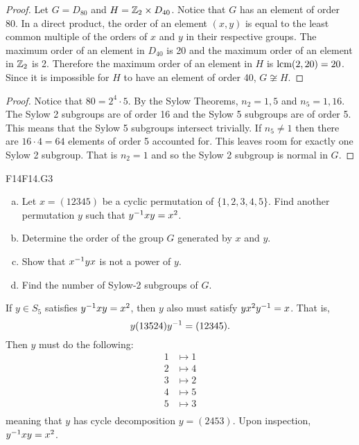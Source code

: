 \documentclass[../../AlgebraQualSolutions.tex]{subfiles}
\begin{document}
	\begin{proof}
		Let $G = D_{80}$ and $H = \mathbb{Z}_2 \times D_{40}$. Notice that $G$ has an element of order 80. In a direct product, the order of an element $(x,y)$ is equal to the least common multiple of the orders of $x$ and $y$ in their respective groups. The maximum order of an element in $D_{40}$ is 20 and the maximum order of an element in $\mathbb{Z}_2$ is 2. Therefore the maximum order of an element in $H$ is $\textrm{lcm}(2,20) = 20$. Since it is impossible for $H$ to have an element of order 40, $G \not\cong H$.
	\end{proof}

	\begin{proof}
		Notice that $80 = 2^4 \cdot 5$. By the Sylow Theorems, $n_2 = 1, 5$ and $n_5 = 1,16$. The Sylow 2 subgroups are of order 16 and the Sylow 5 subgroups are of order 5. This means that the Sylow 5 subgroups intersect trivially. If $n_5 \neq 1$ then there are $16 \cdot 4 = 64$ elements of order 5 accounted for. This leaves room for exactly one Sylow 2 subgroup. That is $n_2 = 1$ and so the Sylow 2 subgroup is normal in $G$.
	\end{proof}

	\begin{prob}{F14}{F14.G3}
		\begin{enumerate}[(a)]
			\item Let $x = (12345)$ be a cyclic permutation of $\{1,2,3,4,5\}$. Find another permutation $y$ such that $y^{-1} xy = x^2$.
			\item Determine the order of the group $G$ generated by $x$ and $y$.
			\item Show that $x^{-1} y x$ is not a power of $y$.
			\item Find the number of Sylow-2 subgroups of $G$.
		\end{enumerate}
	\end{prob}

	\begin{solution}
		If $y \in S_5$ satisfies  $y^{-1} xy = x^2$, then $y$ also must satisfy $yx^2y^{-1} = x$. That is,
			\[y(13524)y^{-1} = (12345).\]
		Then $y$ must do the following:
			\begin{align*}
				1 &\mapsto 1\\
				2 &\mapsto 4\\
				3 &\mapsto 2\\
				4 &\mapsto 5\\
				5 &\mapsto 3\\
			\end{align*}
		meaning that $y$ has cycle decomposition $y = (2453)$. Upon inspection, $y^{-1} x y = x^2$.
	\end{solution}
\end{document}
